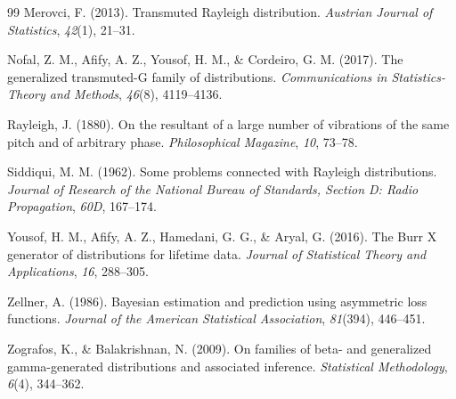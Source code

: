 \documentclass[12pt]{article}
\begin{document}
\begin{thebibliography}{99}
Merovci, F. (2013).
Transmuted Rayleigh distribution.
\emph{Austrian Journal of Statistics}, \emph{42}(1), 21--31.



Nofal, Z. M., Afify, A. Z., Yousof, H. M., \& Cordeiro, G. M. (2017).
The generalized transmuted-G family of distributions.
\emph{Communications in Statistics-Theory and Methods}, \emph{46}(8), 4119--4136.



Rayleigh, J. (1880).
On the resultant of a large number of vibrations of the same pitch and of arbitrary phase.
\emph{Philosophical Magazine}, \emph{10}, 73--78.



Siddiqui, M. M. (1962).
Some problems connected with Rayleigh distributions.
\emph{Journal of Research of the National Bureau of Standards, Section D: Radio Propagation},
\emph{60D}, 167--174.



Yousof, H. M., Afify, A. Z., Hamedani, G. G., \& Aryal, G. (2016).
The Burr X generator of distributions for lifetime data.
\emph{Journal of Statistical Theory and Applications}, \emph{16}, 288--305.



Zellner, A. (1986).
Bayesian estimation and prediction using asymmetric loss functions.
\emph{Journal of the American Statistical Association}, \emph{81}(394), 446--451.



Zografos, K., \& Balakrishnan, N. (2009).
On families of beta- and generalized gamma-generated distributions and associated inference.
\emph{Statistical Methodology}, \emph{6}(4), 344--362.



\end{thebibliography}
\end{document}
